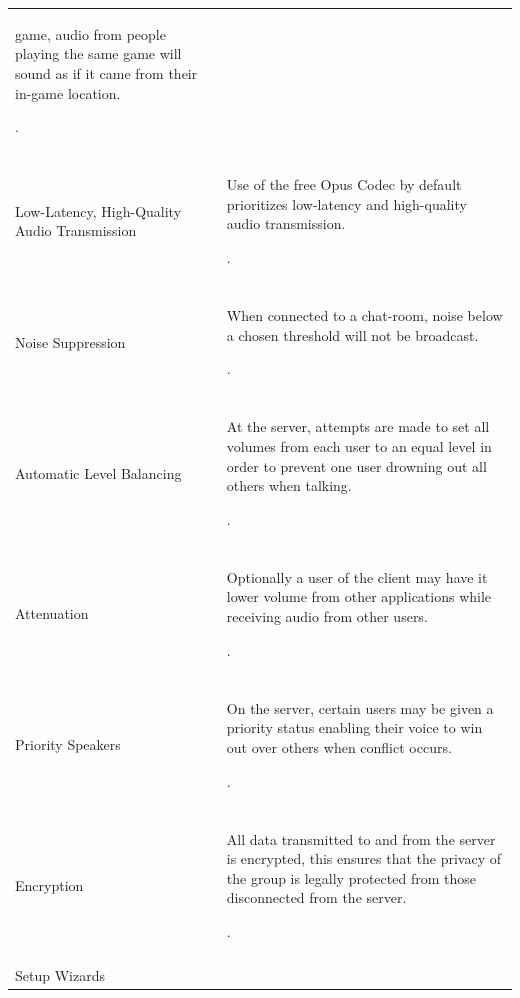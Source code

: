 \documentclass[twoside, titlepage]{article}
\begin{document}
\begin{tabular}[t]{ll}
\begin{minipage}{0.5\textwidth}
			game, audio from people playing the same game will
			sound as if it came from their in-game location.
		\end{minipage}. \\\\
		\rowcolor{gray}
		Low-Latency, High-Quality Audio Transmission & \begin{minipage}{0.5\textwidth}
			Use of the free Opus Codec by default prioritizes
			low-latency and high-quality audio transmission.
		\end{minipage}. \\\\
		Noise Suppression & \begin{minipage}{0.5\textwidth}
			When connected to a chat-room, noise below a
			chosen threshold will not be broadcast.
		\end{minipage}. \\\\
		\rowcolor{gray}
		Automatic Level Balancing & \begin{minipage}{0.5\textwidth}
			At the server, attempts are made to set all volumes
			from each user to an equal level in order to
			prevent one user drowning out all others when
			talking.
		\end{minipage}. \\\\
		Attenuation & \begin{minipage}{0.5\textwidth}
			Optionally a user of the client may have it lower
			volume from other applications while receiving
			audio from other users.
		\end{minipage}. \\\\
		\rowcolor{gray}
		Priority Speakers & \begin{minipage}{0.5\textwidth}
			On the server, certain users may be given a
			priority status enabling their voice to win out
			over others when conflict occurs.
		\end{minipage}. \\\\
		Encryption & \begin{minipage}{0.5\textwidth}
			All data transmitted to and from the server
			is encrypted, this ensures that the privacy of the
			group is legally protected from those disconnected
			from the server.
		\end{minipage}. \\\\
		\rowcolor{gray}
		Setup Wizards & \begin{minipage}{0.5\textwidth}

\end{minipage}
\end{tabular}
\end{document}
